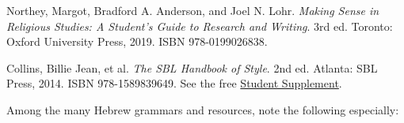 \documentclass[titlepage]{article}
\begin{document}
\begingroup
\renewcommand{\section}[2]{}%
\begin{thebibliography}{Making Sense}%

	 Northey, Margot, Bradford A. Anderson, and Joel N. Lohr.
	\emph{Making Sense in Religious Studies: A Student's Guide to Research and Writing}.
	3rd ed. Toronto: Oxford University Press, 2019. ISBN 978-0199026838.

	 Collins, Billie Jean, et al.
	\emph{The SBL Handbook of Style}.
	2nd ed. Atlanta: SBL Press, 2014. ISBN 978-1589839649. See the free
	\href{https://www.sbl-site.org/assets/pdfs/pubs/SBLHSsupp2015-02.pdf}{Student Supplement}.

\end{thebibliography}
\endgroup

Among the many Hebrew grammars and resources, note the following
especially:
\end{document}
